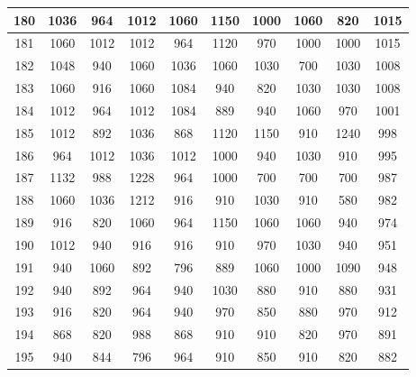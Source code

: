 \documentclass{article}
\begin{document}
\begin{table}
\begin{tabular}{c|c|c|c|c|c|c|c|c|c|}
\multicolumn{1}{|c|}{180} & 1036 & 964  & 1012 & 1060 & 1150 & 1000 & 1060 & 820  & 1015 \\ \hline
\multicolumn{1}{|c|}{181} & 1060 & 1012 & 1012 & 964  & 1120 & 970  & 1000 & 1000 & 1015 \\ \hline
\multicolumn{1}{|c|}{182} & 1048 & 940  & 1060 & 1036 & 1060 & 1030 & 700  & 1030 & 1008 \\ \hline
\multicolumn{1}{|c|}{183} & 1060 & 916  & 1060 & 1084 & 940  & 820  & 1030 & 1030 & 1008 \\ \hline
\multicolumn{1}{|c|}{184} & 1012 & 964  & 1012 & 1084 & 889  & 940  & 1060 & 970  & 1001 \\ \hline
\multicolumn{1}{|c|}{185} & 1012 & 892  & 1036 & 868  & 1120 & 1150 & 910  & 1240 & 998  \\ \hline
\multicolumn{1}{|c|}{186} & 964  & 1012 & 1036 & 1012 & 1000 & 940  & 1030 & 910  & 995  \\ \hline
\multicolumn{1}{|c|}{187} & 1132 & 988  & 1228 & 964  & 1000 & 700  & 700  & 700  & 987  \\ \hline
\multicolumn{1}{|c|}{188} & 1060 & 1036 & 1212 & 916  & 910  & 1030 & 910  & 580  & 982  \\ \hline
\multicolumn{1}{|c|}{189} & 916  & 820  & 1060 & 964  & 1150 & 1060 & 1060 & 940  & 974  \\ \hline
\multicolumn{1}{|c|}{190} & 1012 & 940  & 916  & 916  & 910  & 970  & 1030 & 940  & 951  \\ \hline
\multicolumn{1}{|c|}{191} & 940  & 1060 & 892  & 796  & 889  & 1060 & 1000 & 1090 & 948  \\ \hline
\multicolumn{1}{|c|}{192} & 940  & 892  & 964  & 940  & 1030 & 880  & 910  & 880  & 931  \\ \hline
\multicolumn{1}{|c|}{193} & 916  & 820  & 964  & 940  & 970  & 850  & 880  & 970  & 912  \\ \hline
\multicolumn{1}{|c|}{194} & 868  & 820  & 988  & 868  & 910  & 910  & 820  & 970  & 891  \\ \hline
\multicolumn{1}{|c|}{195} & 940  & 844  & 796  & 964  & 910  & 850  & 910  & 820  & 882  \\ \hline
\end{tabular}
\end{table}
\end{document}

